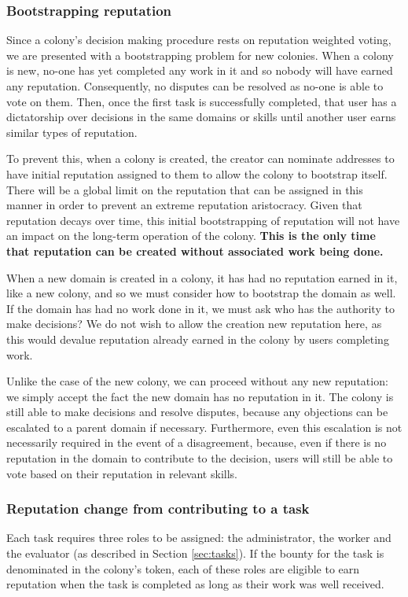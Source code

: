 \subsubsection{Bootstrapping reputation}\label{sec:bootstrapping-rep}
Since a colony's decision making procedure rests on reputation weighted voting, we are presented with a bootstrapping problem for new colonies. When a colony is new, no-one has yet completed any work in it and so nobody will have earned any reputation. Consequently, no disputes can be resolved as no-one is able to vote on them. Then, once the first task is successfully completed, that user has a dictatorship over decisions in the same domains or skills until another user earns similar types of reputation.

To prevent this, when a colony is created, the creator can nominate addresses to have initial reputation assigned to them to allow the colony to bootstrap itself. There will be a global limit on the reputation that can be assigned in this manner in order to prevent an extreme reputation aristocracy. Given that reputation decays over time, this initial bootstrapping of reputation will not have an impact on the long-term operation of the colony. \textbf{This is the only time that reputation can be created without associated work being done.}

When a new domain is created in a colony, it has had no reputation earned in it, like a new colony, and so we must consider how to bootstrap the domain as well. If the domain has had no work done in it, we must ask who has the authority to make decisions? We do not wish to allow the creation new reputation here, as this would devalue reputation already earned in the colony by users completing work. 

Unlike the case of the new colony, we can proceed without any new reputation: we simply accept the fact the new domain has no reputation in it. The colony is still able to make decisions and resolve disputes, because any objections can be escalated to a parent domain if necessary. Furthermore, even this escalation is not necessarily required in the event of a disagreement, because, even if there is no reputation in the domain to contribute to the decision, users will still be able to vote based on their reputation in relevant skills.

\subsubsection{Reputation change from contributing to a task}\label{sec:earning-rep-from-task}
Each task requires three roles to be assigned: the administrator, the worker and the evaluator (as described in Section \ref{sec:tasks}). If the bounty for the task is denominated in the colony's token, each of these roles are eligible to earn reputation when the task is completed as long as their work was well received.

